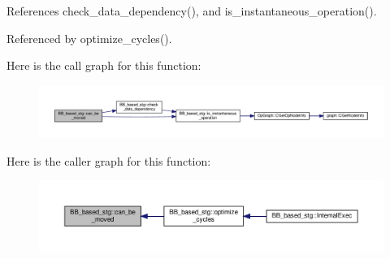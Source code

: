References check\+\_\+data\+\_\+dependency(), and is\+\_\+instantaneous\+\_\+operation().



Referenced by optimize\+\_\+cycles().

Here is the call graph for this function\+:
\nopagebreak
\begin{figure}[H]
\begin{center}
\leavevmode
\includegraphics[width=350pt]{dd/d84/classBB__based__stg_afa058ad5484f1872ffe17234aab986b0_cgraph}
\end{center}
\end{figure}
Here is the caller graph for this function\+:
\nopagebreak
\begin{figure}[H]
\begin{center}
\leavevmode
\includegraphics[width=350pt]{dd/d84/classBB__based__stg_afa058ad5484f1872ffe17234aab986b0_icgraph}
\end{center}
\end{figure}
\mbox{\label{classBB__based__stg_a37ff05a95b3cae65fe5779a3590a52fb}} 

